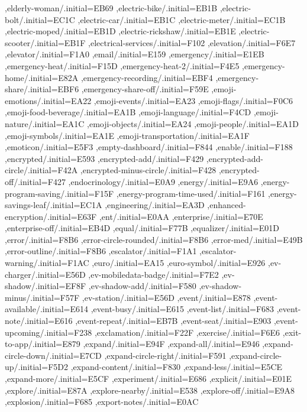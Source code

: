 { ,elderly-woman/.initial=EB69
 ,electric-bike/.initial=EB1B
 ,electric-bolt/.initial=EC1C
 ,electric-car/.initial=EB1C
 ,electric-meter/.initial=EC1B
 ,electric-moped/.initial=EB1D
 ,electric-rickshaw/.initial=EB1E
 ,electric-scooter/.initial=EB1F
 ,electrical-services/.initial=F102
 ,elevation/.initial=F6E7
 ,elevator/.initial=F1A0
 ,email/.initial=E159
 ,emergency/.initial=E1EB
 ,emergency-heat/.initial=F15D
 ,emergency-heat-2/.initial=F4E5
 ,emergency-home/.initial=E82A
 ,emergency-recording/.initial=EBF4
 ,emergency-share/.initial=EBF6
 ,emergency-share-off/.initial=F59E
 ,emoji-emotions/.initial=EA22
 ,emoji-events/.initial=EA23
 ,emoji-flags/.initial=F0C6
 ,emoji-food-beverage/.initial=EA1B
 ,emoji-language/.initial=F4CD
 ,emoji-nature/.initial=EA1C
 ,emoji-objects/.initial=EA24
 ,emoji-people/.initial=EA1D
 ,emoji-symbols/.initial=EA1E
 ,emoji-transportation/.initial=EA1F
 ,emoticon/.initial=E5F3
 ,empty-dashboard/.initial=F844
 ,enable/.initial=F188
 ,encrypted/.initial=E593
 ,encrypted-add/.initial=F429
 ,encrypted-add-circle/.initial=F42A
 ,encrypted-minus-circle/.initial=F428
 ,encrypted-off/.initial=F427
 ,endocrinology/.initial=E0A9
 ,energy/.initial=E9A6
 ,energy-program-saving/.initial=F15F
 ,energy-program-time-used/.initial=F161
 ,energy-savings-leaf/.initial=EC1A
 ,engineering/.initial=EA3D
 ,enhanced-encryption/.initial=E63F
 ,ent/.initial=E0AA
 ,enterprise/.initial=E70E
 ,enterprise-off/.initial=EB4D
 ,equal/.initial=F77B
 ,equalizer/.initial=E01D
 ,error/.initial=F8B6
 ,error-circle-rounded/.initial=F8B6
 ,error-med/.initial=E49B
 ,error-outline/.initial=F8B6
 ,escalator/.initial=F1A1
 ,escalator-warning/.initial=F1AC
 ,euro/.initial=EA15
 ,euro-symbol/.initial=E926
 ,ev-charger/.initial=E56D
 ,ev-mobiledata-badge/.initial=F7E2
 ,ev-shadow/.initial=EF8F
 ,ev-shadow-add/.initial=F580
 ,ev-shadow-minus/.initial=F57F
 ,ev-station/.initial=E56D
 ,event/.initial=E878
 ,event-available/.initial=E614
 ,event-busy/.initial=E615
 ,event-list/.initial=F683
 ,event-note/.initial=E616
 ,event-repeat/.initial=EB7B
 ,event-seat/.initial=E903
 ,event-upcoming/.initial=F238
 ,exclamation/.initial=F22F
 ,exercise/.initial=F6E6
 ,exit-to-app/.initial=E879
 ,expand/.initial=E94F
 ,expand-all/.initial=E946
 ,expand-circle-down/.initial=E7CD
 ,expand-circle-right/.initial=F591
 ,expand-circle-up/.initial=F5D2
 ,expand-content/.initial=F830
 ,expand-less/.initial=E5CE
 ,expand-more/.initial=E5CF
 ,experiment/.initial=E686
 ,explicit/.initial=E01E
 ,explore/.initial=E87A
 ,explore-nearby/.initial=E538
 ,explore-off/.initial=E9A8
 ,explosion/.initial=F685
 ,export-notes/.initial=E0AC
}
